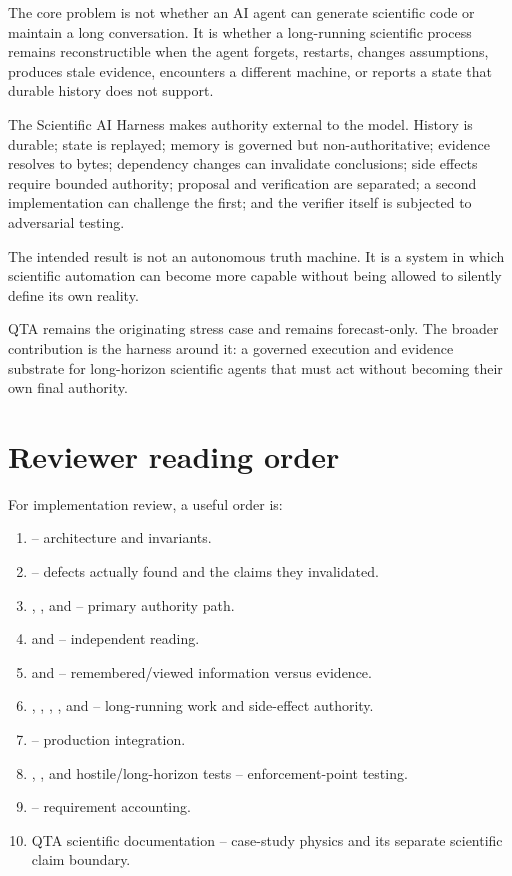 The core problem is not whether an AI agent can generate scientific code or maintain a long conversation. It is whether a long-running scientific process remains reconstructible when the agent forgets, restarts, changes assumptions, produces stale evidence, encounters a different machine, or reports a state that durable history does not support.

The Scientific AI Harness makes authority external to the model. History is durable; state is replayed; memory is governed but non-authoritative; evidence resolves to bytes; dependency changes can invalidate conclusions; side effects require bounded authority; proposal and verification are separated; a second implementation can challenge the first; and the verifier itself is subjected to adversarial testing.

The intended result is not an autonomous truth machine. It is a system in which scientific automation can become more capable without being allowed to silently define its own reality.

QTA remains the originating stress case and remains forecast-only. The broader contribution is the harness around it: a governed execution and evidence substrate for long-horizon scientific agents that must act without becoming their own final authority.

\appendix
\section{Reviewer reading order}
For implementation review, a useful order is:
\begin{enumerate}
  \item {} -- architecture and invariants.
  \item {} -- defects actually found and the claims they invalidated.
  \item {}, , and  -- primary authority path.
  \item {} and  -- independent reading.
  \item {} and  -- remembered/viewed information versus evidence.
  \item {}, , , , and  -- long-running work and side-effect authority.
  \item {} -- production integration.
  \item {}, , and hostile/long-horizon tests -- enforcement-point testing.
  \item {} -- requirement accounting.
  \item QTA scientific documentation -- case-study physics and its separate scientific claim boundary.
\end{enumerate}

